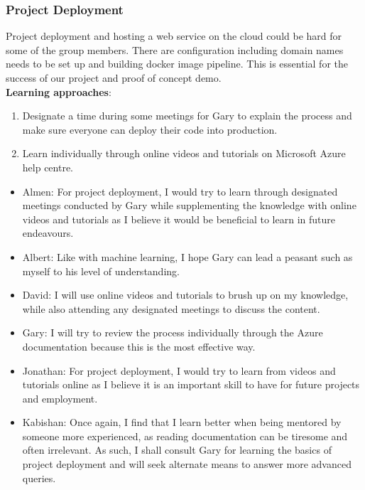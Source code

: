 \documentclass[12pt,letterpaper]{article}
\begin{document}
\subsubsection{Project Deployment}
Project deployment and hosting a web service on the cloud could be hard for some
of the group members. There are configuration including domain names needs to be
set up and building docker image pipeline. This is essential for the success of
our project and proof of concept demo. \\[.1in]
\noindent \textbf{Learning approaches}:
\begin{enumerate}
    \item Designate a time during some meetings for Gary to explain the process
    and make sure everyone can deploy their code into production.
    \item Learn individually through online videos and tutorials on Microsoft
    Azure help centre.
\end{enumerate}

\begin{itemize}
    \item Almen: For project deployment, I would try to learn through designated
    meetings conducted by Gary while supplementing the knowledge with online
    videos and tutorials as I believe it would be beneficial to learn in future
    endeavours.
    \item Albert: Like with machine learning, I hope Gary can lead a peasant
    such as myself to his level of understanding.
    \item David: I will use online videos and tutorials to brush up on my
    knowledge, while also attending any designated meetings to discuss the
    content.
    \item Gary: I will try to review the process individually through the Azure
    documentation because this is the most effective way.
    \item Jonathan: For project deployment, I would try to learn from videos and
    tutorials online as I believe it is an important skill to have for future
    projects and employment.
    \item Kabishan: Once again, I find that I learn better when being mentored
    by someone more experienced, as reading documentation can be tiresome and
    often irrelevant. As such, I shall consult Gary for learning the basics of
    project deployment and will seek alternate means to answer more advanced
    queries.
\end{itemize}

\printbibliography
\end{document}
